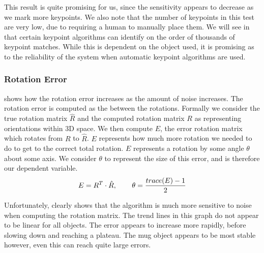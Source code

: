 This result is quite promising for us, since the sensitivity appears to decrease as we mark more keypoints. We also note that the number of keypoints in this test are very low, due to requiring a human to manually place them. We will see in  that certain keypoint algorithms can identify on the order of thousands of keypoint matches. While this is dependent on the object used, it is promising as to the reliability of the system when automatic keypoint algorithms are used.

\subsubsection{Rotation Error}
 shows how the rotation error increases as the amount of noise increases. The rotation error is computed as the  between the rotations. Formally we consider the true rotation matrix $\hat{R}$ and the computed rotation matrix $R$ as representing orientations within 3D space. We then compute $E$, the error rotation matrix which rotates from $R$ to $\hat{R}$. $E$ represents how much more rotation we needed to do to get to the correct total rotation. $E$ represents a rotation by some angle $\theta$ about some axis. We consider $\theta$ to represent the size of this error, and is therefore our dependent variable. 
$$E = R^T \cdot \hat{R}, \operatorname{\operatorname{\: \: \: \:} \operatorname{\: \: \: \:}} \theta = \frac{trace(E) - 1}{2}$$

Unfortunately,  clearly shows that the algorithm is much more sensitive to noise when computing the rotation matrix. The trend lines in this graph do not appear to be linear for all objects. The error appears to increase more rapidly, before slowing down and reaching a plateau. The mug object appears to be most stable however, even this can reach quite large errors.\\

